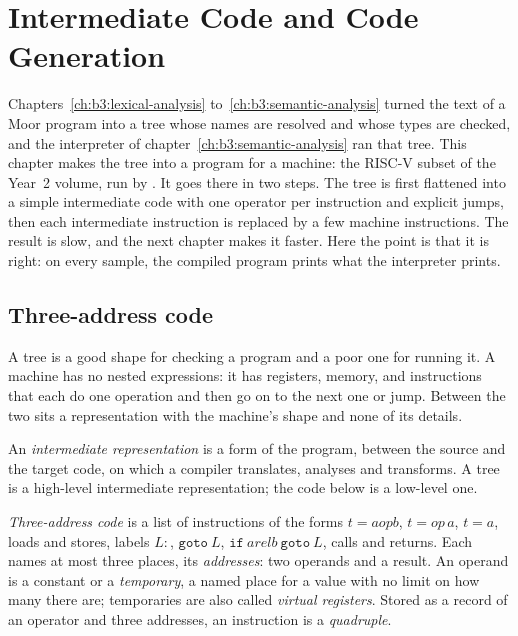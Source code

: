 \chapter{Intermediate Code and Code Generation}\label{ch:b3:code-generation}

Chapters~\ref{ch:b3:lexical-analysis} to~\ref{ch:b3:semantic-analysis} turned the text of a Moor program into a tree whose names are resolved and whose types are checked, and the interpreter of chapter~\ref{ch:b3:semantic-analysis} ran that tree. This chapter makes the tree into a program for a machine: the RISC-V subset of the Year~2 volume, run by . It goes there in two steps. The tree is first flattened into a simple intermediate code with one operator per instruction and explicit jumps, then each intermediate instruction is replaced by a few machine instructions. The result is slow, and the next chapter makes it faster. Here the point is that it is right: on every sample, the compiled program prints what the interpreter prints.

\section{Three-address code}\label{sec:b3:code-generation:tac}

A tree is a good shape for checking a program and a poor one for running it. A machine has no nested expressions: it has registers, memory, and instructions that each do one operation and then go on to the next one or jump. Between the two sits a representation with the machine's shape and none of its details.

\begin{definition}\label{def:b3:code-generation:ir}
An \emph{intermediate representation} is a form of the program, between the source and the target code, on which a compiler translates, analyses and transforms. A tree is a high-level intermediate representation; the code below is a low-level one.
\end{definition}

\begin{definition}\label{def:b3:code-generation:tac}
\emph{Three-address code} is a list of instructions of the forms $t = a \mathbin{\mathit{op}} b$, $t = \mathit{op}\,a$, $t = a$, loads and stores, labels $L\!:$, $\mathtt{goto}\ L$, $\mathtt{if}\ a \mathbin{\mathit{rel}} b\ \mathtt{goto}\ L$, calls and returns. Each names at most three places, its \emph{addresses}: two operands and a result. An operand is a constant or a \emph{temporary}, a named place for a value with no limit on how many there are; temporaries are also called \emph{virtual registers}. Stored as a record of an operator and three addresses, an instruction is a \emph{quadruple}.
\end{definition}

